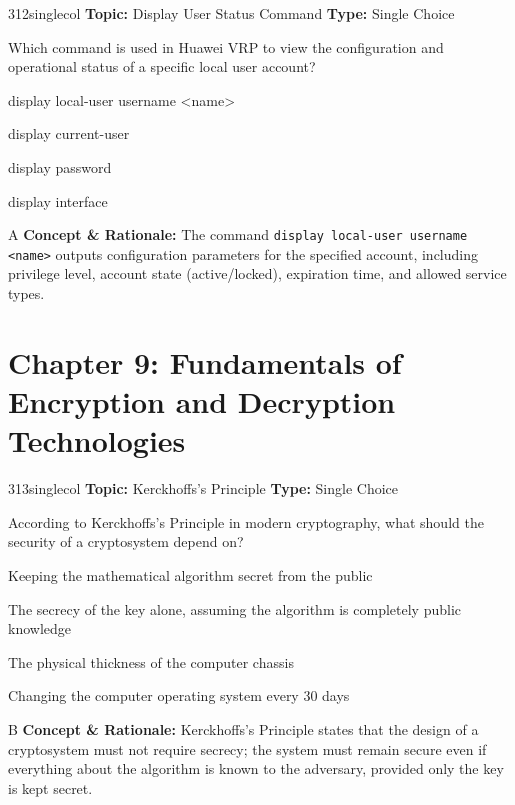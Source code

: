 \begin{qcard}{312}{singlecol}
\textcolor{darkslate!75}{\small\textbf{Topic:} Display User Status Command \hfill \textbf{Type:} Single Choice}\vspace{0.4em}\par
Which command is used in Huawei VRP to view the configuration and operational status of a specific local user account?
\begin{qoptions}
\item display local-user username \textless{}name\textgreater{}
\item display current-user
\item display password
\item display interface
\end{qoptions}
\end{qcard}
\nopagebreak
\begin{explainbox}{A}
\textbf{Concept \& Rationale:} The command \texttt{display local-user username \textless{}name\textgreater{}} outputs configuration parameters for the specified account, including privilege level, account state (active/locked), expiration time, and allowed service types.
\end{explainbox}

\section{Chapter 9: Fundamentals of Encryption and Decryption Technologies}

\begin{qcard}{313}{singlecol}
\textcolor{darkslate!75}{\small\textbf{Topic:} Kerckhoffs's Principle \hfill \textbf{Type:} Single Choice}\vspace{0.4em}\par
According to Kerckhoffs's Principle in modern cryptography, what should the security of a cryptosystem depend on?
\begin{qoptions}
\item Keeping the mathematical algorithm secret from the public
\item The secrecy of the key alone, assuming the algorithm is completely public knowledge
\item The physical thickness of the computer chassis
\item Changing the computer operating system every 30 days
\end{qoptions}
\end{qcard}
\nopagebreak
\begin{explainbox}{B}
\textbf{Concept \& Rationale:} Kerckhoffs's Principle states that the design of a cryptosystem must not require secrecy; the system must remain secure even if everything about the algorithm is known to the adversary, provided only the key is kept secret.
\end{explainbox}

